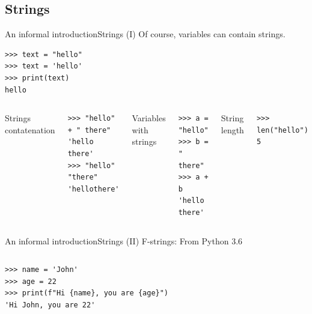 \documentclass[10pt,compress]{beamer} %
\begin{document}
\subsection{Strings}

\begin{frame}[fragile]{An informal introduction}{Strings (I)}
	Of course, variables can contain strings.
	\begin{exampleblock}{}
		\begin{verbatim}
>>> text = "hello"
>>> text = 'hello'
>>> print(text)
hello
\end{verbatim}
	\end{exampleblock}

	\begin{columns}[T]
		Strings contatenation
				\begin{exampleblock}{}
				\begin{verbatim}
>>> "hello" + " there"
'hello there'
>>> "hello" "there"
'hellothere'
\end{verbatim}
				\end{exampleblock}

		Variables with strings
				\begin{exampleblock}{}
				\begin{verbatim}
>>> a = "hello"
>>> b = " there"
>>> a + b
'hello there'
\end{verbatim}
				\end{exampleblock}

		String length
				\begin{exampleblock}{}
				\begin{verbatim}
>>> len("hello")
5
\end{verbatim}
				\end{exampleblock}
		\end{columns}
\end{frame}

\begin{frame}[fragile]{An informal introduction}{Strings (II)}
	\vspace{-0.2cm}
	F-strings: From Python 3.6
	\vspace{-0.3cm}
	\begin{columns}
\begin{block}{}
\begin{verbatim}
>>> name = 'John'
>>> age = 22
>>> print(f"Hi {name}, you are {age}")
'Hi John, you are 22'
\end{verbatim}
\end{block}
\end{columns}
\end{frame}
\end{document}
